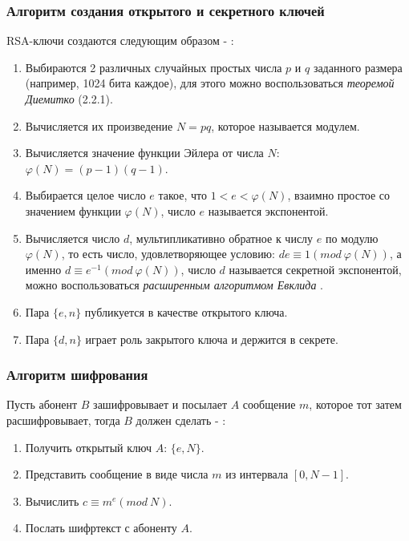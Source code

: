   \subsubsection{Алгоритм создания открытого и секретного ключей}
  RSA-ключи создаются следующим образом - \cite[Глава 9, страницы 148-155]{tilb06}:
  
    \begin{enumerate}
     \item Выбираются 2 различных случайных простых числа $p$ и $q$ заданного размера (например, 1024 бита каждое), для этого
      можно воспользоваться \textit{теоремой Диемитко} (2.2.1).
     \item Вычисляется их произведение $N = p q$, которое называется модулем.
     \item Вычисляется значение функции Эйлера от числа $N$: $\varphi(N) = (p - 1)(q - 1)$.
     \item Выбирается целое число $e$ такое, что $1 < e < \varphi(N)$, взаимно простое со значением функции $\varphi(N)$, 
     число $e$ называется экспонентой.
     \item Вычисляется число $d$, мультипликативно обратное к числу $e$ по модулю $\varphi(N)$, то есть число, удовлетворяющее 
     условию: $d e \equiv 1(mod \: \varphi(N))$, а именно $d \equiv e^{-1} (mod \: \varphi(N))$, число $d$ 
     называется секретной экспонентой, можно воспользоваться \textit{расширенным алгоритмом Евклида} \cite[Глава 1.8, страницы 23-25]{ish11}.
     \item Пара $\{e, n\}$ публикуется в качестве открытого ключа.
     \item Пара $\{d, n\}$ играет роль закрытого ключа и держится в секрете.
    \end{enumerate}

  \subsubsection{Алгоритм шифрования}
  Пусть абонент $B$ зашифровывает и посылает $A$ сообщение $m$, которое тот затем расшифровывает, тогда $B$ должен сделать
  - \cite[Глава 9, страницы 148-155]{tilb06}:
  
    \begin{enumerate}
     \item Получить открытый ключ $A$: $\{e, N\}$.
     \item Представить сообщение в виде числа $m$ из интервала $[0, N - 1]$.
     \item Вычислить $c \equiv m^{e} (mod \: N)$.
     \item Послать шифртекст с абоненту $A$.
    \end{enumerate}
  
